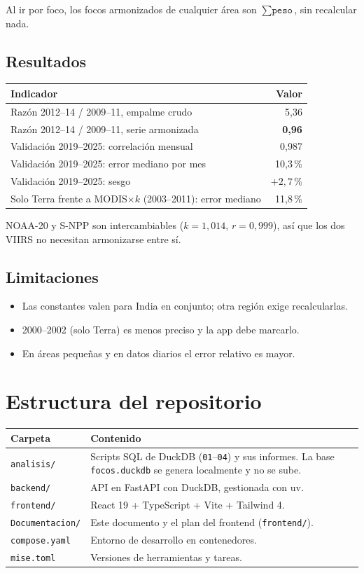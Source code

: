 \documentclass[11pt,a4paper]{article}
\begin{document}
Al ir por foco, los focos armonizados de cualquier área son $\sum \texttt{peso}$, sin recalcular nada.

\subsection*{Resultados}

\begin{tabularx}{\linewidth}{@{}Xr@{}}
\toprule
Indicador & Valor \\
\midrule
Razón 2012--14 / 2009--11, empalme crudo & 5{,}36 \\
Razón 2012--14 / 2009--11, serie armonizada & \textbf{0{,}96} \\
Validación 2019--2025: correlación mensual & 0{,}987 \\
Validación 2019--2025: error mediano por mes & 10{,}3\,\% \\
Validación 2019--2025: sesgo & $+2{,}7$\,\% \\
Solo Terra frente a MODIS$\times k$ (2003--2011): error mediano & 11{,}8\,\% \\
\bottomrule
\end{tabularx}

NOAA-20 y S-NPP son intercambiables ($k = 1{,}014$, $r = 0{,}999$), así que los dos VIIRS no
necesitan armonizarse entre sí.

\subsection*{Limitaciones}
\begin{itemize}
  \item Las constantes valen para India en conjunto; otra región exige recalcularlas.
  \item 2000--2002 (solo Terra) es menos preciso y la app debe marcarlo.
  \item En áreas pequeñas y en datos diarios el error relativo es mayor.
\end{itemize}

\section{Estructura del repositorio}

\begin{tabularx}{\linewidth}{@{}lX@{}}
\toprule
Carpeta & Contenido \\
\midrule
\texttt{analisis/} & Scripts SQL de DuckDB (\texttt{01}--\texttt{04}) y sus informes. La base
  \texttt{focos.duckdb} se genera localmente y no se sube. \\
\texttt{backend/} & API en FastAPI con DuckDB, gestionada con uv. \\
\texttt{frontend/} & React 19 + TypeScript + Vite + Tailwind 4. \\
\texttt{Documentacion/} & Este documento y el plan del frontend (\texttt{frontend/}). \\
\texttt{compose.yaml} & Entorno de desarrollo en contenedores. \\
\texttt{mise.toml} & Versiones de herramientas y tareas. \\
\bottomrule
\end{tabularx}
\end{document}
